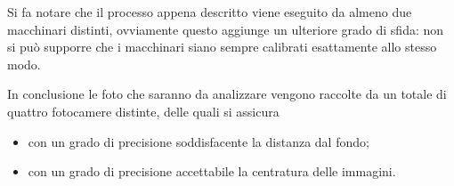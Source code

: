 Si fa notare che il processo appena descritto viene eseguito da almeno due macchinari distinti, ovviamente questo aggiunge un ulteriore grado di sfida: non si può supporre che i macchinari siano sempre calibrati esattamente allo stesso modo.

In conclusione le foto che saranno da analizzare vengono raccolte da un totale di quattro fotocamere distinte, delle quali si assicura
\begin{itemize}
  \item con un grado di precisione soddisfacente la distanza dal fondo;
  \item con un grado di precisione accettabile la centratura delle immagini.
\end{itemize}


